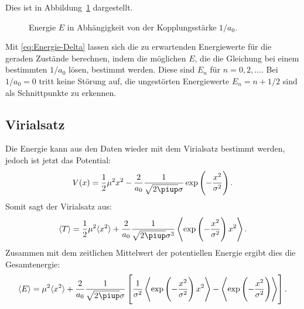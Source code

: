 Dies ist in Abbildung~\ref{fig:E_a0} dargestellt.

\begin{figure}[htbp]
    \centering
    \caption{%
        Energie $E$ in Abhängigkeit von der Kopplungsstärke $1/a_0$.
    }
    \label{fig:E_a0}
\end{figure}

Mit \eqref{eq:Energie-Delta} lassen sich die zu erwartenden Energiewerte für
die geraden Zustände berechnen, indem die möglichen $E$, die die Gleichung bei
einem bestimmten $1/a_0$ lösen, bestimmt werden. Diese sind $E_n$ für $n = 0,
2, \ldots$. Bei $1/a_0 = 0$ tritt keine Störung auf, die ungestörten
Energiewerte $E_n = n + 1/2$ sind als Schnittpunkte zu erkennen.



\subsection{Virialsatz}

Die Energie kann aus den Daten wieder mit dem Virialsatz bestimmt werden,
jedoch ist jetzt das Potential:
\[
    V(x) = \frac12 \mu^2 x^2 - \frac{2}{a_0} \frac1{\sqrt{2\piup}\sigma}
    \exp\del{-\frac{x^2}{\sigma^2}}.
\]
Somit sagt der Virialsatz aus:
\[
    \bracket T = \frac12 \mu^2 \bracket{x^2} + \frac{2}{a_0}
    \frac1{\sqrt{2\piup}\sigma^3} \Bracket{\exp\del{-\frac{x^2}{\sigma^2}}
    x^2}.
\]
Zusammen mit dem zeitlichen Mittelwert der potentiellen Energie ergibt dies die
Gesamtenergie:
\[
    \bracket E = \mu^2 \bracket{x^2} + \frac{2}{a_0}
    \frac1{\sqrt{2\piup}\sigma} \sbr{\frac1{\sigma^2}
    \Bracket{\exp\del{-\frac{x^2}{\sigma^2}} x^2} -
    \Bracket{\exp\del{-\frac{x^2}{\sigma^2}}}}.
\]

